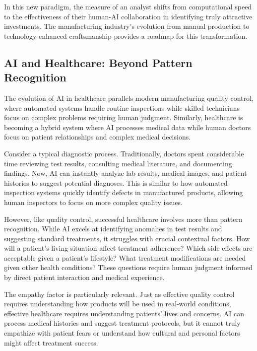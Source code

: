 \documentclass[
  Letterpaper,
]{scrbook}
\begin{document}
In this new paradigm, the measure of an analyst shifts from
computational speed to the effectiveness of their human-AI collaboration
in identifying truly attractive investments. The manufacturing
industry's evolution from manual production to technology-enhanced
craftsmanship provides a roadmap for this transformation.

\subsection{AI and Healthcare: Beyond Pattern
Recognition}\label{ai-and-healthcare-beyond-pattern-recognition}

The evolution of AI in healthcare parallels modern manufacturing quality
control, where automated systems handle routine inspections while
skilled technicians focus on complex problems requiring human judgment.
Similarly, healthcare is becoming a hybrid system where AI processes
medical data while human doctors focus on patient relationships and
complex medical decisions.

Consider a typical diagnostic process. Traditionally, doctors spent
considerable time reviewing test results, consulting medical literature,
and documenting findings. Now, AI can instantly analyze lab results,
medical images, and patient histories to suggest potential diagnoses.
This is similar to how automated inspection systems quickly identify
defects in manufactured products, allowing human inspectors to focus on
more complex quality issues.

However, like quality control, successful healthcare involves more than
pattern recognition. While AI excels at identifying anomalies in test
results and suggesting standard treatments, it struggles with crucial
contextual factors. How will a patient's living situation affect
treatment adherence? Which side effects are acceptable given a patient's
lifestyle? What treatment modifications are needed given other health
conditions? These questions require human judgment informed by direct
patient interaction and medical experience.

The empathy factor is particularly relevant. Just as effective quality
control requires understanding how products will be used in real-world
conditions, effective healthcare requires understanding patients' lives
and concerns. AI can process medical histories and suggest treatment
protocols, but it cannot truly empathize with patient fears or
understand how cultural and personal factors might affect treatment
success.
\end{document}

